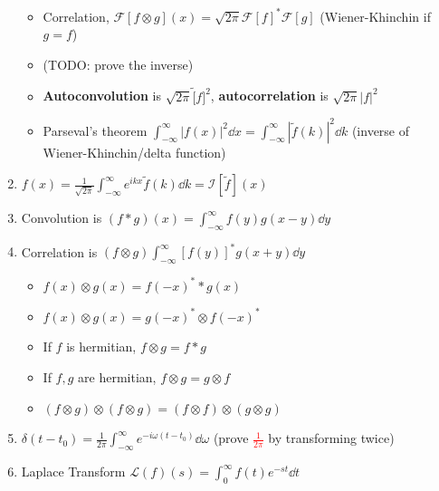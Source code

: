 \documentclass{article}
\theoremstyle{remark}
\theoremstyle{remark}
\begin{document}
\begin{enumerate}
\begin{itemize}
                    \item Correlation, $\mathcal{F}[f\otimes g](x)=\sqrt{2\pi}\mathcal{F}[f]^*\mathcal{F}[g] $ (Wiener-Khinchin if $g=f$)
                    \item (TODO: prove the inverse)
                    \item \textbf{Autoconvolution} is $\sqrt{2\pi}\tilde[f]^2$, \textbf{autocorrelation} is $\sqrt{2\pi}|f|^2$
                    \item Parseval's theorem $\int_{-\infty}^{\infty} |f(x)|^2 \dd x = \int_{-\infty}^{\infty} |\tilde{f}(k)|^2 \dd k$ (inverse of Wiener-Khinchin/delta function)
                \end{itemize}
        \item $f(x)=\frac{1}{\sqrt{2\pi}}\int_{-\infty}^{\infty} e^{ikx}\tilde{f}(k) \dd k =\mathcal{I}[\tilde{f}](x)$
        \item Convolution is $(f*g)(x)=\int_{-\infty}^{\infty} f(y)g(x-y) \dd y $
        \item Correlation is $(f\otimes g)\int_{-\infty}^{\infty}[f(y)]^*g(x+y)\dd y $\begin{itemize}
            \item $f(x)\otimes g(x)=f(-x)^* * g(x) $
            \item $f(x)\otimes g(x) = g(-x)^*\otimes f(-x)^* $
            \item If $f$ is hermitian, $f\otimes g=f*g $
            \item If $f,g$ are hermitian, $f\otimes g=g\otimes f $
            \item $(f\otimes g)\otimes(f\otimes g)=(f\otimes f)\otimes(g\otimes g) $
        \end{itemize}
        \item $\delta(t-t_0)=\frac{1}{2\pi}\int_{-\infty}^\infty e^{-i\omega (t-t_0)}\dd \omega$ (prove \textcolor{red}{$\frac{1}{2\pi}$} by transforming twice)
        \item Laplace Transform $\mathcal{L}(f)(s)=\int_{0}^{\infty} f(t)e^{-st} \dd t $
    \end{enumerate}
\end{document}
